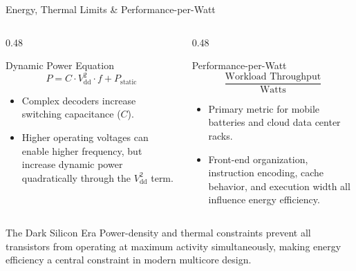 \documentclass[aspectratio=169,11pt,t]{beamer}
\begin{document}
\begin{frame}{Energy, Thermal Limits \& Performance-per-Watt}
\vfill
\begin{columns}[T,onlytextwidth]
\begin{column}{0.48\textwidth}
\begin{block}{Dynamic Power Equation}
\small
$$P = C \cdot V_{\text{dd}}^2 \cdot f + P_{\text{static}}$$
\begin{itemize}\setlength{\itemsep}{3pt}
  \item Complex decoders increase switching capacitance ($C$).
  \item Higher operating voltages can enable higher frequency, but increase dynamic power quadratically through the $V_{\text{dd}}^2$ term.
\end{itemize}
\end{block}
\end{column}

\begin{column}{0.48\textwidth}
\begin{block}{Performance-per-Watt}
\small
$$\frac{\text{Workload Throughput}}{\text{Watts}}$$
\begin{itemize}\setlength{\itemsep}{3pt}
  \item Primary metric for mobile batteries and cloud data center racks.
  \item Front-end organization, instruction encoding, cache behavior, and execution width all influence energy efficiency.
\end{itemize}
\end{block}
\end{column}
\end{columns}

\vfill
\begin{block}{The Dark Silicon Era}
\small Power-density and thermal constraints prevent all transistors from operating at maximum activity simultaneously, making energy efficiency a central constraint in modern multicore design.
\end{block}
\vfill
\end{frame}











\end{document}
